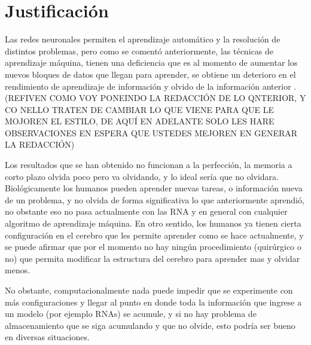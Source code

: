 \section{Justificación}

    Las redes neuronales permiten el aprendizaje automático y la resolución 
    de distintos problemas,  pero como se comentó anteriormente,  las técnicas 
    de aprendizaje máquina, tienen una deficiencia que es al momento de aumentar 
    los nuevos bloques de datos que llegan para aprender,  se obtiene un deterioro 
    en el rendimiento de aprendizaje de información y olvido de la información anterior
    \cite{bullinaria2009}.   (REFIVEN COMO VOY PONEINDO LA REDACCIÓN DE LO QNTERIOR, Y 
    CO NELLO TRATEN DE CAMBIAR LO QUE VIENE PARA QUE LE MOJOREN EL ESTILO, DE AQUÍ EN 
    ADELANTE SOLO LES HARE OBSERVACIONES EN ESPERA QUE USTEDES MEJOREN EN GENERAR LA 
    REDACCIÓN)
    
    Los resultados que se han obtenido no funcionan a la perfección, la 
    memoria a corto plazo olvida poco pero va olvidando, y lo ideal sería que no 
    olvidara. Biológicamente los humanos pueden aprender nuevas tareas, o información 
    nueva de un problema, y no olvida de forma significativa lo que anteriormente 
    aprendió, no obstante eso no pasa actualmente con las RNA y en general con 
    cualquier algoritmo de aprendizaje máquina. En otro sentido, los humanos 
    ya tienen cierta configuración en el cerebro que les permite aprender como 
    se hace actualmente,  y se puede afirmar que por el momento no hay ningún 
    procedimiento (quirúrgico o no) que permita modificar la estructura del cerebro 
    para aprender mas y olvidar menos. 

    No obstante,  computacionalmente nada puede impedir que se experimente con más 
    configuraciones y llegar al punto en donde toda la información que ingrese a un 
    modelo (por ejemplo RNAs) se acumule, y si no hay problema de almacenamiento que se siga 
    acumulando y que no olvide, esto podría ser bueno en diversas situaciones.

